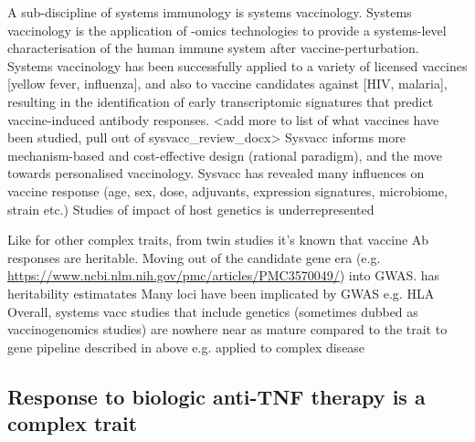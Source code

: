\begin{outline}
\1 A sub-discipline of systems immunology is systems vaccinology.
    \2 Systems vaccinology is the application of -omics technologies to provide a systems-level characterisation of the human immune system after vaccine-perturbation.
    \2 Systems vaccinology has been successfully applied to a variety of licensed vaccines [yellow fever, influenza], and also to vaccine candidates against [HIV, malaria], resulting in the identification of early transcriptomic signatures that predict vaccine-induced antibody responses.
        \3 <add more to list of what vaccines have been studied, pull out of sysvacc\_review\_docx>
    \2 Sysvacc informs more mechanism-based and cost-effective design (rational paradigm), and the move towards personalised vaccinology.
    \2 Sysvacc has revealed many influences on vaccine response (age, sex, dose, adjuvants, expression signatures, microbiome, strain etc.)
    \2 Studies of impact of host genetics is underrepresented \autocite{linnik2016ImpactHostGenetic}

\1 Like for other complex traits, from twin studies it's known that vaccine Ab responses are heritable.
    \2 Moving out of the candidate gene era (e.g. \url{https://www.ncbi.nlm.nih.gov/pmc/articles/PMC3570049/}) into GWAS.
    \2 \autocite{oconnor2013CharacterizingVaccineResponses} has heritability estimatates
    \2 Many loci have been implicated by GWAS e.g. HLA \autocite{oconnor2013CharacterizingVaccineResponses,mooney2013SystemsImmunogeneticsVaccines,mentzer2015SearchingHumanGenetic,linnik2016ImpactHostGenetic,scepanovic2018HumanGeneticVariants,dhakal2019HostFactorsImpact}
    \2 Overall, systems vacc studies that include genetics (sometimes dubbed as vaccinogenomics studies) are nowhere near as mature compared to the trait to gene pipeline described in above e.g. applied to complex disease

\subsection{Response to biologic anti-TNF therapy is a complex trait}


\end{outline}
